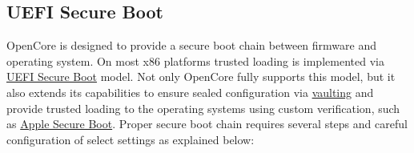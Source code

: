 \documentclass[]{article}
\begin{document}
\subsection{UEFI Secure Boot}\label{uefisecureboot}

OpenCore is designed to provide a secure boot chain between firmware
and operating system. On most x86 platforms trusted loading is implemented
via \href{https://en.wikipedia.org/wiki/UEFI_Secure_Boot}{UEFI Secure Boot} model.
Not only OpenCore fully supports this model, but it also extends its capabilities
to ensure sealed configuration via \hyperref[securevaulting]{vaulting} and
provide trusted loading to the operating systems using custom verification,
such as \hyperref[secureapplesb]{Apple Secure Boot}. Proper secure boot chain
requires several steps and careful configuration of select settings as explained below:
\end{document}
